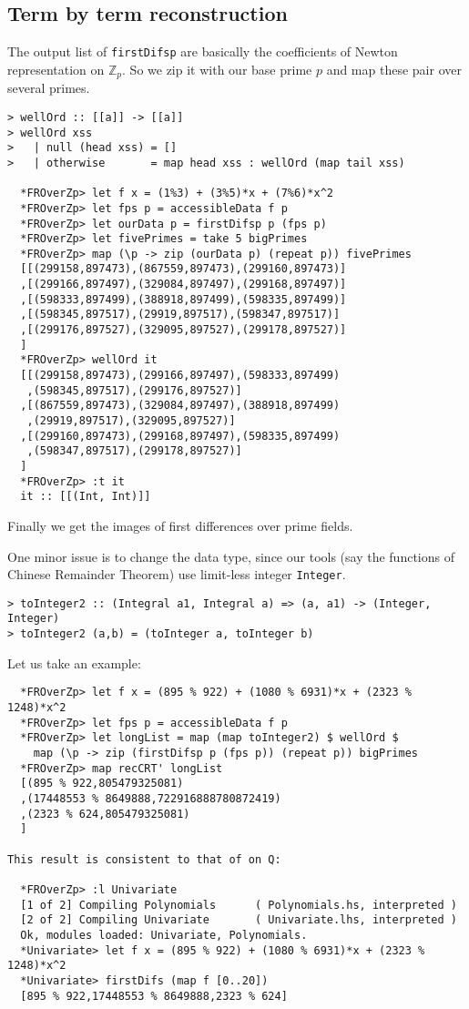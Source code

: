 \documentclass[11pt]{book}
\begin{document}
\subsection{Term by term reconstruction}
The output list of \texttt{firstDifsp} are basically the coefficients of Newton representation on $\mathbb{Z}_p$.
So we zip it with our base prime $p$ and map these pair over several primes.
\begin{verbatim}
> wellOrd :: [[a]] -> [[a]]
> wellOrd xss 
>   | null (head xss) = [] 
>   | otherwise       = map head xss : wellOrd (map tail xss)

  *FROverZp> let f x = (1%3) + (3%5)*x + (7%6)*x^2
  *FROverZp> let fps p = accessibleData f p
  *FROverZp> let ourData p = firstDifsp p (fps p)
  *FROverZp> let fivePrimes = take 5 bigPrimes 
  *FROverZp> map (\p -> zip (ourData p) (repeat p)) fivePrimes 
  [[(299158,897473),(867559,897473),(299160,897473)]
  ,[(299166,897497),(329084,897497),(299168,897497)]
  ,[(598333,897499),(388918,897499),(598335,897499)]
  ,[(598345,897517),(29919,897517),(598347,897517)]
  ,[(299176,897527),(329095,897527),(299178,897527)]
  ]
  *FROverZp> wellOrd it
  [[(299158,897473),(299166,897497),(598333,897499)
   ,(598345,897517),(299176,897527)]
  ,[(867559,897473),(329084,897497),(388918,897499)
   ,(29919,897517),(329095,897527)]
  ,[(299160,897473),(299168,897497),(598335,897499)
   ,(598347,897517),(299178,897527)]
  ]
  *FROverZp> :t it
  it :: [[(Int, Int)]]
\end{verbatim}
Finally we get the images of first differences over prime fields.

One minor issue is to change the data type, since our tools (say the functions of Chinese Remainder Theorem) use limit-less integer \texttt{Integer}.
\begin{verbatim}
> toInteger2 :: (Integral a1, Integral a) => (a, a1) -> (Integer, Integer)
> toInteger2 (a,b) = (toInteger a, toInteger b)
\end{verbatim}

Let us take an example:
\begin{verbatim}
  *FROverZp> let f x = (895 % 922) + (1080 % 6931)*x + (2323 % 1248)*x^2
  *FROverZp> let fps p = accessibleData f p
  *FROverZp> let longList = map (map toInteger2) $ wellOrd $ 
    map (\p -> zip (firstDifsp p (fps p)) (repeat p)) bigPrimes 
  *FROverZp> map recCRT' longList 
  [(895 % 922,805479325081)
  ,(17448553 % 8649888,722916888780872419)
  ,(2323 % 624,805479325081)
  ]

This result is consistent to that of on Q:

  *FROverZp> :l Univariate
  [1 of 2] Compiling Polynomials      ( Polynomials.hs, interpreted )
  [2 of 2] Compiling Univariate       ( Univariate.lhs, interpreted )
  Ok, modules loaded: Univariate, Polynomials.
  *Univariate> let f x = (895 % 922) + (1080 % 6931)*x + (2323 % 1248)*x^2
  *Univariate> firstDifs (map f [0..20])
  [895 % 922,17448553 % 8649888,2323 % 624]
\end{verbatim}
\end{document}
